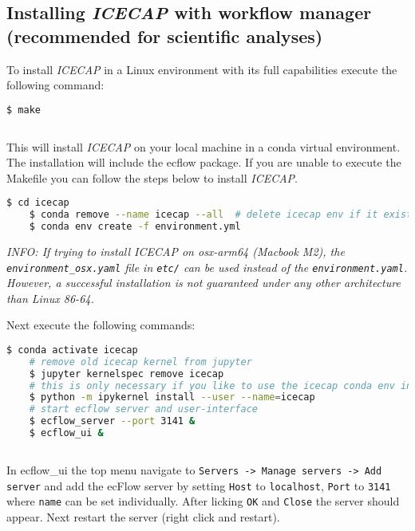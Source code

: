 \documentclass[DIV=10, parskip=full]{scrreprt}
\newcommand{\ice}{\textit{ICECAP}\xspace}
\newcommand{\info}[1]{\textit{INFO: #1}}
\begin{document}

\subsection{Installing \ice with workflow manager (recommended for scientific analyses)}
To install \ice in a Linux environment with its full capabilities execute the following command:
\begin{lstlisting}[language=bash]
	$ make
	
\end{lstlisting}

This will install \ice  on your local machine in a conda virtual environment. The installation will include the ecflow package. If you are unable to execute the Makefile you can follow the steps below to install \ice. \\

\begin{lstlisting}[language=bash]
	$ cd icecap
	$ conda remove --name icecap --all  # delete icecap env if it exists
	$ conda env create -f environment.yml 
\end{lstlisting}

\info{If trying to install \ice on osx-arm64 (Macbook M2), the \texttt{environment\_osx.yaml} file in \texttt{etc/} can be used instead of the  \texttt{environment.yaml}. However, a successful installation is not guaranteed under any other architecture than Linux 86-64.}

Next execute the following commands:\\

\begin{lstlisting}[language=bash]
	$ conda activate icecap
	# remove old icecap kernel from jupyter
	$ jupyter kernelspec remove icecap
	# this is only necessary if you like to use the icecap conda env in jupyter-lab
	$ python -m ipykernel install --user --name=icecap
	# start ecflow server and user-interface
	$ ecflow_server --port 3141 &
	$ ecflow_ui & 
	
\end{lstlisting}

	

In ecflow\_ui the top menu navigate to \texttt{Servers -> Manage servers -> Add server} and add the ecFlow server by setting \texttt{Host} to \texttt{localhost}, \texttt{Port} to \texttt{3141} where \texttt{name} can be set individually. After licking \texttt{OK} and \texttt{Close} the server should appear. Next restart the server (right click and restart).\\
\end{document}
